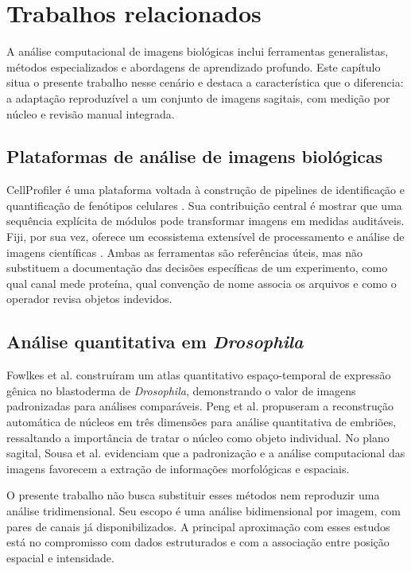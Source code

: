 \chapter{Trabalhos relacionados}
\label{cap:trabalhosrelacionados}

A análise computacional de imagens biológicas inclui ferramentas generalistas, métodos especializados e abordagens de aprendizado profundo. Este capítulo situa o presente trabalho nesse cenário e destaca a característica que o diferencia: a adaptação reproduzível a um conjunto de imagens sagitais, com medição por núcleo e revisão manual integrada.

\section{Plataformas de análise de imagens biológicas}

CellProfiler é uma plataforma voltada à construção de pipelines de identificação e quantificação de fenótipos celulares \cite{Carpenter2006}. Sua contribuição central é mostrar que uma sequência explícita de módulos pode transformar imagens em medidas auditáveis. Fiji, por sua vez, oferece um ecossistema extensível de processamento e análise de imagens científicas \cite{Schindelin2012}. Ambas as ferramentas são referências úteis, mas não substituem a documentação das decisões específicas de um experimento, como qual canal mede proteína, qual convenção de nome associa os arquivos e como o operador revisa objetos indevidos.

\section{Análise quantitativa em \textit{Drosophila}}

Fowlkes et al. \cite{Fowlkes2008} construíram um atlas quantitativo espaço-temporal de expressão gênica no blastoderma de \textit{Drosophila}, demonstrando o valor de imagens padronizadas para análises comparáveis. Peng et al. \cite{Peng2011} propuseram a reconstrução automática de núcleos em três dimensões para análise quantitativa de embriões, ressaltando a importância de tratar o núcleo como objeto individual. No plano sagital, Sousa et al. \cite{Sousa2020,Sousa2025} evidenciam que a padronização e a análise computacional das imagens favorecem a extração de informações morfológicas e espaciais.

O presente trabalho não busca substituir esses métodos nem reproduzir uma análise tridimensional. Seu escopo é uma análise bidimensional por imagem, com pares de canais já disponibilizados. A principal aproximação com esses estudos está no compromisso com dados estruturados e com a associação entre posição espacial e intensidade.

